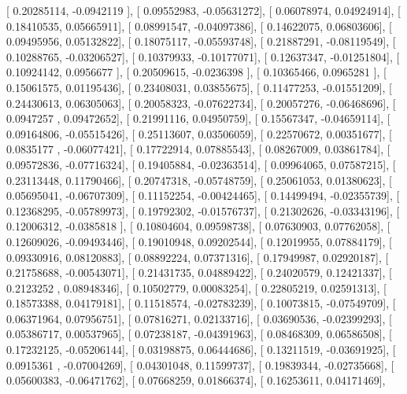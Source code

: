 \documentclass{article}
\begin{document}
       [ 0.20285114, -0.0942119 ],
       [ 0.09552983, -0.05631272],
       [ 0.06078974,  0.04924914],
       [ 0.18410535,  0.05665911],
       [ 0.08991547, -0.04097386],
       [ 0.14622075,  0.06803606],
       [ 0.09495956,  0.05132822],
       [ 0.18075117, -0.05593748],
       [ 0.21887291, -0.08119549],
       [ 0.10288765, -0.03206527],
       [ 0.10379933, -0.10177071],
       [ 0.12637347, -0.01251804],
       [ 0.10924142,  0.0956677 ],
       [ 0.20509615, -0.0236398 ],
       [ 0.10365466,  0.0965281 ],
       [ 0.15061575,  0.01195436],
       [ 0.23408031,  0.03855675],
       [ 0.11477253, -0.01551209],
       [ 0.24430613,  0.06305063],
       [ 0.20058323, -0.07622734],
       [ 0.20057276, -0.06468696],
       [ 0.0947257 ,  0.09472652],
       [ 0.21991116,  0.04950759],
       [ 0.15567347, -0.04659114],
       [ 0.09164806, -0.05515426],
       [ 0.25113607,  0.03506059],
       [ 0.22570672,  0.00351677],
       [ 0.0835177 , -0.06077421],
       [ 0.17722914,  0.07885543],
       [ 0.08267009,  0.03861784],
       [ 0.09572836, -0.07716324],
       [ 0.19405884, -0.02363514],
       [ 0.09964065,  0.07587215],
       [ 0.23113448,  0.11790466],
       [ 0.20747318, -0.05748759],
       [ 0.25061053,  0.01380623],
       [ 0.05695041, -0.06707309],
       [ 0.11152254, -0.00424465],
       [ 0.14499494, -0.02355739],
       [ 0.12368295, -0.05789973],
       [ 0.19792302, -0.01576737],
       [ 0.21302626, -0.03343196],
       [ 0.12006312, -0.0385818 ],
       [ 0.10804604,  0.09598738],
       [ 0.07630903,  0.07762058],
       [ 0.12609026, -0.09493446],
       [ 0.19010948,  0.09202544],
       [ 0.12019955,  0.07884179],
       [ 0.09330916,  0.08120883],
       [ 0.08892224,  0.07371316],
       [ 0.17949987,  0.02920187],
       [ 0.21758688, -0.00543071],
       [ 0.21431735,  0.04889422],
       [ 0.24020579,  0.12421337],
       [ 0.2123252 ,  0.08948346],
       [ 0.10502779,  0.00083254],
       [ 0.22805219,  0.02591313],
       [ 0.18573388,  0.04179181],
       [ 0.11518574, -0.02783239],
       [ 0.10073815, -0.07549709],
       [ 0.06371964,  0.07956751],
       [ 0.07816271,  0.02133716],
       [ 0.03690536, -0.02399293],
       [ 0.05386717,  0.00537965],
       [ 0.07238187, -0.04391963],
       [ 0.08468309,  0.06586508],
       [ 0.17232125, -0.05206144],
       [ 0.03198875,  0.06444686],
       [ 0.13211519, -0.03691925],
       [ 0.0915361 , -0.07004269],
       [ 0.04301048,  0.11599737],
       [ 0.19839344, -0.02735668],
       [ 0.05600383, -0.06471762],
       [ 0.07668259,  0.01866374],
       [ 0.16253611,  0.04171469],
\end{document}
